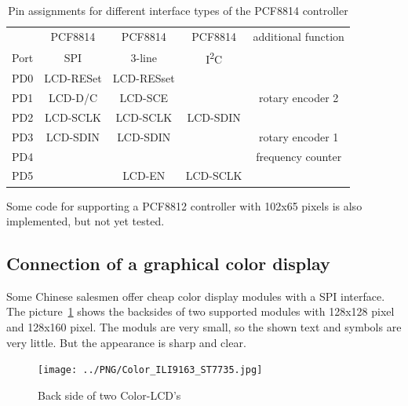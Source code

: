 \begin{table}[H]
  \begin{center}
    \begin{tabular}{| c || c | c | c | c |}
    \hline
           &  PCF8814    & PCF8814        & PCF8814     & additional function \\
      Port &    SPI      & 3-line         &   I\textsuperscript{2}C      & \\
    \hline
    \hline
    PD0    &   LCD-RESet  & LCD-RESset       &            & \\
    \hline
    PD1    &   LCD-D/C   & LCD-SCE        &             & rotary encoder 2 \\
    \hline
    PD2    &   LCD-SCLK  & LCD-SCLK       &  LCD-SDIN   & \\
    \hline
    PD3    &   LCD-SDIN  & LCD-SDIN       &             & rotary encoder 1 \\
    \hline
    PD4    &             &                &             & frequency counter \\
    \hline
    PD5    &             & LCD-EN         &   LCD-SCLK  & \\
    \hline
    \end{tabular}
  \end{center}
  \caption{Pin assignments for different interface types of the PCF8814 controller}
  \label{tab:PCF8814-con}
\end{table}

Some code for supporting a PCF8812 controller with 102x65 pixels is also implemented,
but not yet tested.

\subsection{Connection of a graphical color display}

Some Chinese salesmen offer cheap color display modules with a SPI interface.
The picture~\ref{fig:Color_both} shows the backsides of two supported modules with 128x128 pixel
and 128x160 pixel. 
The moduls are very small, so the shown text and symbols are very little.
But the appearance is sharp and clear.

\begin{figure}[H]
\centering
\texttt{[image: ../PNG/Color\_ILI9163\_ST7735.jpg]}
\caption{Back side of two Color-LCD's}
\label{fig:Color_both}
\end{figure}

